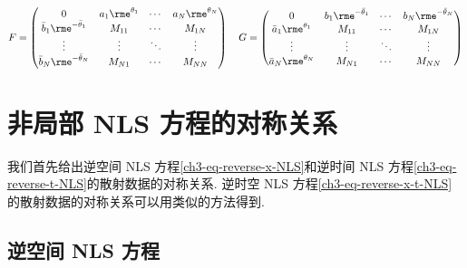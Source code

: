 \begin{equation}
    F = \begin{pmatrix}
        0                                    & a_{1} \rme^{\theta_{1}} & \cdots & a_{N} \rme^{\theta_{N}} \\
        \bar{b}_{1} \rme^{-\bar{\theta}_{1}} & M_{11}                  & \cdots & M_{1N}                  \\
        \vdots                               & \vdots                  & \ddots & \vdots                  \\
        \bar{b}_{N} \rme^{-\bar{\theta}_{N}} & M_{N1}                  & \cdots & M_{NN}
    \end{pmatrix}
    \quad
    G = \begin{pmatrix}
        0                             & b_{1} \rme^{-\bar{\theta}_{1}} & \cdots & b_{N} \rme^{-\bar{\theta}_{N}} \\
        \bar{a}_{1} \rme^{\theta_{1}} & M_{11}                         & \cdots & M_{1N}                         \\
        \vdots                        & \vdots                         & \ddots & \vdots                         \\
        \bar{a}_{N} \rme^{\theta_{N}} & M_{N1}                         & \cdots & M_{NN}
    \end{pmatrix}
\end{equation}
\section{非局部 NLS 方程的对称关系}
我们首先给出逆空间 NLS 方程\eqref{ch3-eq-reverse-x-NLS}和逆时间 NLS 方程\eqref{ch3-eq-reverse-t-NLS}的散射数据的对称关系. 逆时空 NLS 方程\eqref{ch3-eq-reverse-x-t-NLS}的散射数据的对称关系可以用类似的方法得到.
\subsection{逆空间 NLS 方程}

